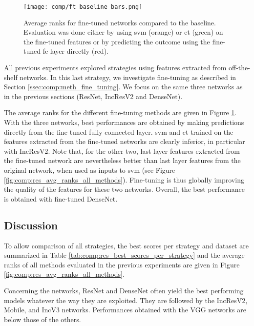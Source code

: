 \begin{figure}
    \centering
    \texttt{[image: comp/ft\_baseline\_bars.png]}
    \caption{Average ranks for fine-tuned networks compared to the baseline. Evaluation was done either by using \acrshort{svm} (orange) or \acrlong{et} (green) on the fine-tuned features or by predicting the outcome using the fine-tuned \acrlong{fc} layer directly (red).}
    \label{fig:comp:res_avg_ranks_ft}
\end{figure}

All previous experiments explored strategies using features extracted from off-the-shelf networks. In this last strategy, we investigate fine-tuning as described in Section \ref{ssec:comp:meth_fine_tuning}. We focus on the same three networks as in the previous sections (ResNet, IncResV2 and DenseNet).

The average ranks for the different fine-tuning methods are given in Figure \ref{fig:comp:res_avg_ranks_ft}. With the three networks, best performances are obtained by making predictions directly from the fine-tuned fully connected layer. \acrshort{svm} and \acrshort{et} trained on the features extracted from the fine-tuned networks are clearly inferior, in particular with IncResV2. Note that, for the other two, last layer features extracted from the fine-tuned network are nevertheless better than last layer features from the original network, when used as inputs to \acrshort{svm} (see Figure \ref{fig:comp:res_avg_ranks_all_methods}). Fine-tuning is thus globally improving the quality of the features for these two networks. Overall, the best performance is obtained with fine-tuned DenseNet.


\subsection{Discussion}
\label{ssec:comp:exp_comparing}

To allow comparison of all strategies, the best scores per strategy and dataset are summarized in Table \ref{tab:comp:res_best_scores_per_strategy} and the average ranks of all methods evaluated in the previous experiments are given in Figure \ref{fig:comp:res_avg_ranks_all_methods}.

Concerning the networks, ResNet and DenseNet often yield the best performing models whatever the way they are exploited. They are followed by the IncResV2, Mobile, and IncV3 networks. Performances obtained with the VGG networks are below those of the others.

